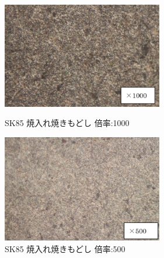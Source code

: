\documentclass[10pt，a4j]{jsarticle}
\begin{document}
  \begin{figure}[htbp]
    \begin{minipage}{0.5\hsize}
      \begin{center}
        \includegraphics[width=7cm]{../img/SK85_yakiiremodoshi_1000.png}
        \caption{SK85 焼入れ焼きもどし 倍率:1000}
      \end{center}
    \end{minipage}
    \begin{minipage}{0.5\hsize}
      \begin{center}
        \includegraphics[width=7cm]{../img/SK85_yakiiremodoshi_500.png}
        \caption{SK85 焼入れ焼きもどし 倍率:500}
      \end{center}
    \end{minipage}
  \end{figure}
\end{document}
